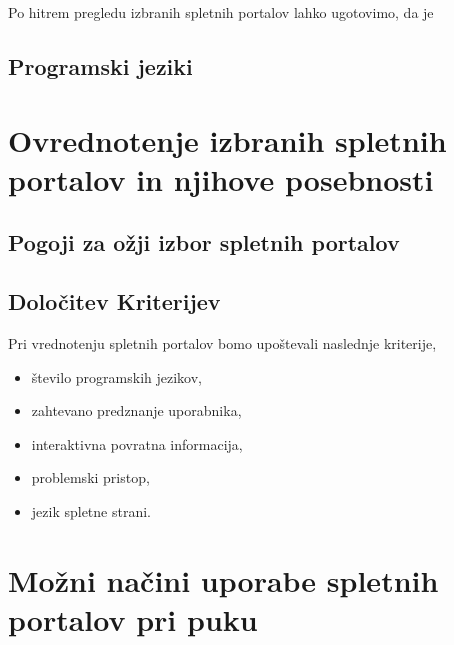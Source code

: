 Po hitrem pregledu izbranih spletnih portalov lahko ugotovimo, da je

\subsection{Programski jeziki}
\label{sec:programski_jeziki}


\section{Ovrednotenje izbranih spletnih portalov in njihove posebnosti}
\label{sec:pregled_spletnih_portalov}

\subsection{Pogoji za ožji izbor spletnih portalov}
\label{sec:pogoji_za_ožji_izbor_sp}



\subsection{Določitev Kriterijev}
\label{sec:dolocitev_kriterijev}

Pri vrednotenju spletnih portalov bomo upoštevali naslednje
kriterije,


\begin{itemize}
\item število programskih jezikov,
\item zahtevano predznanje uporabnika,
\item interaktivna povratna informacija,
\item problemski pristop,
\item jezik spletne strani.
\end{itemize}



\section{Možni načini uporabe spletnih portalov pri puku}
\label{sec:načini_uporabe_sp}




